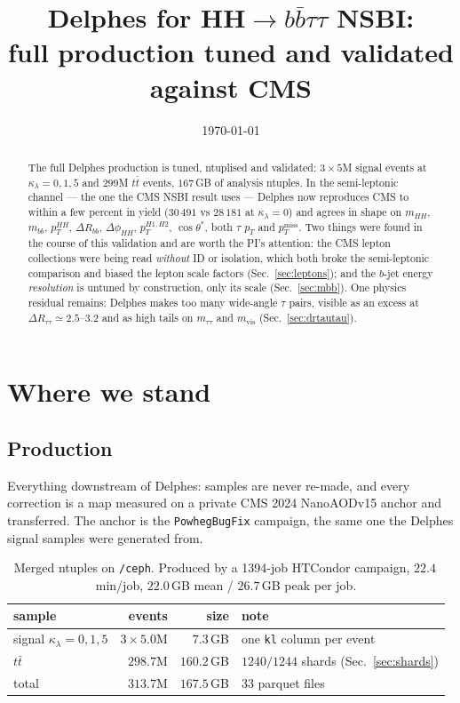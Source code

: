 \documentclass[11pt,a4paper]{article}
\title{\vspace{-1.5cm}Delphes for HH$\rightarrow b\bar b\tau\tau$ NSBI:\\
\large full production tuned and validated against CMS}
\author{}
\date{\today}
\newcommand{\mtautau}{m_{\tau\tau}}
\newcommand{\mvis}{m_{\mathrm{vis}}}
\newcommand{\kl}{\kappa_{\lambda}}
\newcommand{\dR}{\Delta R}
\newcommand{\ptmiss}{p_{T}^{\mathrm{miss}}}
\begin{document}
\maketitle
\vspace{-0.8cm}

\begin{abstract}
\noindent
The full Delphes production is tuned, ntuplised and validated: $3\times5$M signal events at
$\kl=0,1,5$ and $299$M $t\bar t$ events, $167\,$GB of analysis ntuples. In the
semi-leptonic channel --- the one the CMS NSBI result uses --- Delphes now reproduces CMS
to within a few percent in yield ($30\,491$ vs $28\,181$ at $\kl=0$) and agrees in shape on
$m_{HH}$, $m_{bb}$, $p_{T}^{HH}$, $\dR_{bb}$, $\Delta\phi_{HH}$, $p_{T}^{H1,H2}$,
$\cos\theta^{*}$, both $\tau$ $p_{T}$ and $\ptmiss$. Two things were found in the course of
this validation and are worth the PI's attention: the CMS lepton collections were being read
\emph{without} ID or isolation, which both broke the semi-leptonic comparison and biased the
lepton scale factors (Sec.~\ref{sec:leptons}); and the $b$-jet energy \emph{resolution} is
untuned by construction, only its scale (Sec.~\ref{sec:mbb}). One physics residual remains:
Delphes makes too many wide-angle $\tau$ pairs, visible as an excess at
$\dR_{\tau\tau}\simeq2.5$--$3.2$ and as high tails on $\mtautau$ and $\mvis$
(Sec.~\ref{sec:drtautau}).
\end{abstract}

\section{Where we stand}

\subsection{Production}

Everything downstream of Delphes: samples are never re-made, and every correction is a map
measured on a private CMS 2024 NanoAODv15 anchor and transferred. The anchor is the
\texttt{PowhegBugFix} campaign, the same one the Delphes signal samples were generated from.

\begin{table}[htbp]
\centering\small
\begin{tabular}{lrrl}
\toprule
sample & events & size & note \\
\midrule
signal $\kl=0,1,5$ & $3\times5.0$M & $7.3\,$GB & one \texttt{kl} column per event \\
$t\bar t$          & $298.7$M      & $160.2\,$GB & $1240/1244$ shards (Sec.~\ref{sec:shards}) \\
\midrule
total              & $313.7$M      & $167.5\,$GB & 33 parquet files \\
\bottomrule
\end{tabular}
\caption{Merged ntuples on \texttt{/ceph}. Produced by a 1394-job HTCondor campaign,
$22.4\,$min/job, $22.0\,$GB mean / $26.7\,$GB peak per job.\label{tab:production}}
\end{table}
\end{document}
